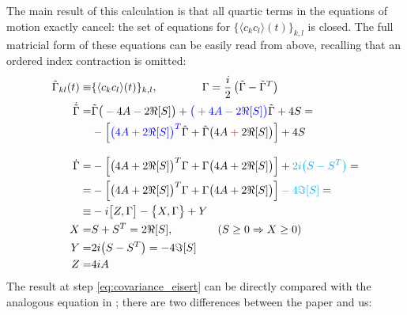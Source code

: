 \documentclass[a4paper,11pt]{article}
\theoremstyle{remark}
\newcommand{\mean}[1]{\ensuremath{\langle #1 \rangle}}
\newcommand*{\mathcolor}{}  %
\def\mathcolor#1#{\mathcoloraux{#1}}
\newcommand*{\mathcoloraux}[3]{%
  \protect\leavevmode
  \begingroup
    \color#1{#2}#3%
  \endgroup
}
\begin{document}
   The main result of this calculation is that all quartic terms in the equations of motion exactly cancel: the set of equations for $\{\mean{c_kc_l}(t)\}_{k,l}$ is closed. The full matricial form of these equations can be easily read from above, recalling that an ordered index contraction is omitted:
   \begin{subequations}
   \label{eq:covariance_qme}
   \begin{align}
    \tilde{\Gamma}_{kl}(t) \equiv & \{\mean{c_kc_l}(t)\}_{k,l},\quad\quad\quad\quad \Gamma = \frac{i}{2}\left(\tilde{\Gamma}-\tilde{\Gamma}^T\right) \notag\\
    \dot{\tilde{\Gamma}} =&\tilde{\Gamma}\big(\mathcolor{red}{-}4A\mathcolor{red}{-}2\Re[S]\big) + \mathcolor{blue}{\big(\mathcolor{red}{+}4A\mathcolor{red}{-}2\Re[S]\big)}\tilde{\Gamma} + 4S=\notag\\ &\mathcolor{red}{-}\left[\mathcolor{blue}{\big(4A\mathcolor{red}{+}2\Re[S]\big)^{T}}\tilde{\Gamma}+\tilde{\Gamma}\big(4A\mathcolor{red}{+}2\Re[S]\big)\right] +4S  \notag\\[0.3cm]
    \dot{\Gamma}=& -\left[\big(4A+2\Re[S]\big)^{T}\Gamma+\Gamma\big(4A+2\Re[S]\big)\right]+\mathcolor{cyan}{2i\big(S-S^T\big)}=\notag\\
                =& -\left[\big(4A+2\Re[S]\big)^{T}\Gamma+\Gamma\big(4A+2\Re[S]\big)\right]\mathcolor{cyan}{-4\Im[S]}=\label{eq:covariance_eisert}\\
                \equiv& -i\big[Z,\Gamma\big] - \big\{X,\Gamma\big\}+Y\label{eq:covariance_qme_compact}\\
    X =& S+S^T = 2\Re[S], \quad\quad\quad\quad (S\geq 0\Rightarrow X\geq 0) \notag\\
    Y =& 2i\big(S-S^T\big) = -4\Im[S] \notag \\
    Z =& 4iA \notag
   \end{align}
   \end{subequations}
   The result at step \ref{eq:covariance_eisert} can be directly compared with the analogous equation in \cite{Eisert2010}; there are two differences between the paper and us: 
\end{document}

